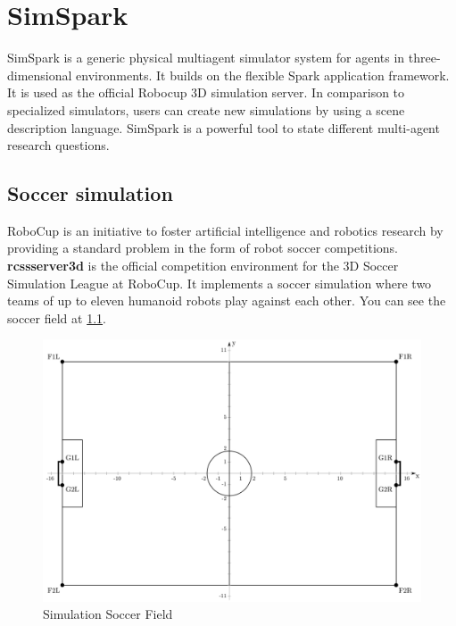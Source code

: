 \chapter{SimSpark}
\label{SimSpark}

SimSpark is a generic physical multiagent simulator system for agents in three-dimensional environments. It builds on the flexible Spark application framework.
It is used as the official Robocup 3D simulation server. In comparison to specialized simulators, users can create new simulations by using a scene description language. SimSpark is a powerful tool to state different multi-agent research questions.
\section{Soccer simulation}
RoboCup is an initiative to foster artificial intelligence and robotics research by providing a standard problem in the form of robot soccer competitions. { \bf rcssserver3d} is the official competition environment for the 3D Soccer Simulation League at RoboCup. It implements a soccer simulation where two teams of up to eleven humanoid robots play against each other. You can see the soccer field at \ref{fig:SimulationSoccerField}.
\begin{figure}[ht!]
\centering
  \includegraphics[scale=1.5]{Chapter2/figures/1280px-SoccerSimulation_FieldPlan.png}
  \caption{Simulation Soccer Field} 
  \label{fig:SimulationSoccerField}
\end{figure}
